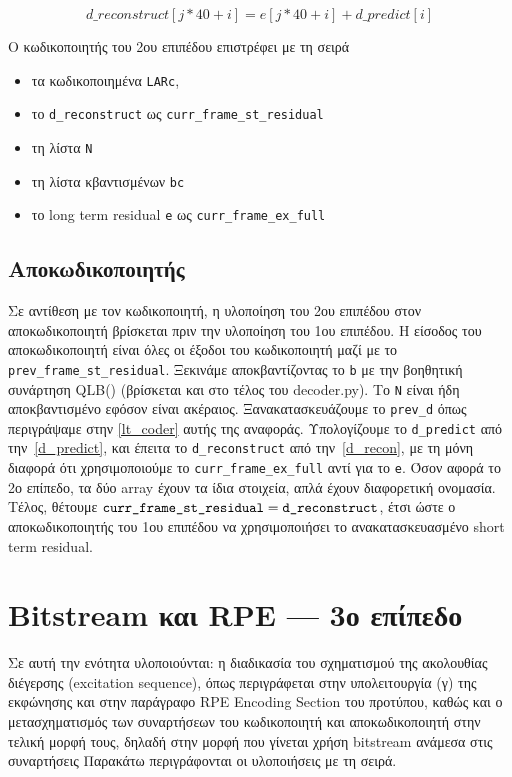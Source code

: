 \documentclass{article}
\begin{document}
\begin{equation}\label{d_recon}
    d\_reconstruct[j*40 + i] = e[j*40 + i] + d\_predict[i]
\end{equation}

Ο κωδικοποιητής του 2ου επιπέδου επιστρέφει με τη σειρά 
\begin{itemize}
    \item τα κωδικοποιημένα \verb|LARc|,
    \item το \verb|d_reconstruct| ως \verb|curr_frame_st_residual|
    \item τη λίστα \verb|N|
    \item τη λίστα κβαντισμένων \verb|bc| 
    \item το long term residual \verb|e| ως \verb|curr_frame_ex_full|
\end{itemize}


\subsection{Αποκωδικοποιητής}
Σε αντίθεση με τον κωδικοποιητή, η υλοποίηση του 2ου επιπέδου στον 
αποκωδικοποιητή βρίσκεται πριν την υλοποίηση του 1ου επιπέδου. Η
είσοδος του αποκωδικοποιητή είναι όλες οι έξοδοι του κωδικοποιητή
μαζί με το \verb|prev_frame_st_residual|.
Ξεκινάμε αποκβαντίζοντας το \verb|b| με την βοηθητική συνάρτηση 
QLB() (βρίσκεται και στο τέλος του decoder.py)\@. Το 
\verb|N| είναι ήδη αποκβαντισμένο εφόσον είναι ακέραιος. 
Ξανακατασκευάζουμε το \verb|prev_d| όπως περιγράψαμε στην 
\autoref{lt_coder} αυτής της αναφοράς. Υπολογίζουμε το \verb|d_predict| 
από την~\autoref{d_predict},
και έπειτα το \verb|d_reconstruct| από την~\autoref{d_recon}, με τη μόνη 
διαφορά ότι χρησιμοποιούμε το \verb|curr_frame_ex_full| αντί για το
\verb|e|. Όσον αφορά το 2ο επίπεδο, τα δύο array έχουν τα ίδια 
στοιχεία, απλά έχουν διαφορετική ονομασία. 
Τέλος, θέτουμε $\verb|curr_frame_st_residual| = \verb|d_reconstruct|$,
έτσι ώστε ο αποκωδικοποιητής του 1ου επιπέδου να χρησιμοποιήσει το 
ανακατασκευασμένο short term residual.

\section{Bitstream και RPE --- 3ο επίπεδο}

Σε αυτή την ενότητα υλοποιούνται: η διαδικασία του σχηματισμού
της ακολουθίας διέγερσης (excitation sequence), όπως περιγράφεται στην
υπολειτουργία (γ) της εκφώνησης και στην παράγραφο RPE Encoding Section
του προτύπου, καθώς και ο μετασχηματισμός των συναρτήσεων του
κωδικοποιητή και αποκωδικοποιητή στην τελική μορφή τους, δηλαδή
στην μορφή που γίνεται χρήση bitstream ανάμεσα στις συναρτήσεις
Παρακάτω περιγράφονται οι υλοποιήσεις με τη σειρά.
\end{document}
